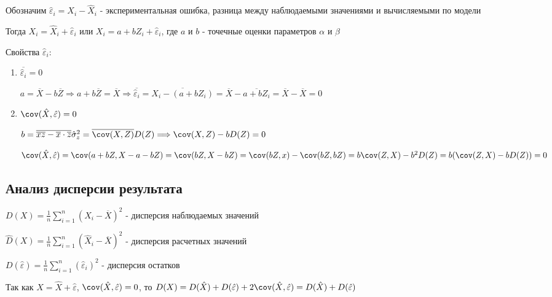 \documentclass[12pt]{article}
\begin{document}
Обозначим $\hat \varepsilon_i = X_i - \hat X_i$ - экспериментальная ошибка, разница между наблюдаемыми значениями и 
вычисляемыми по модели

Тогда $X_i = \hat X_i + \hat \varepsilon_i$ или $X_i = a + b Z_i + \hat \varepsilon_i$, где $a$ и $b$ - точечные оценки параметров $\alpha$ и $\beta$

Свойства $\hat \varepsilon_i$:

\begin{enumerate}
    \item $\overline{\hat \varepsilon_i} = 0$

    \begin{MyProof}
        $a = \overline{X} - b \overline{Z} \Longrightarrow a + b \overline{Z} = \overline{X} \Longrightarrow \overline{\hat \varepsilon_i} = \overline{X_i - (a + b Z_i)} = \overline{X} - \overline{a + b Z_i} = \overline{X} - \overline{X} = 0$
    \end{MyProof}

    \item $\cov (\hat X, \hat \varepsilon) = 0$

    \begin{MyProof}
        $b = \overline{\overline{xz} - \overline{x} \cdot \overline{z}}{\hat \sigma^2_z} = \overline{\cov (X, Z)}{D(Z)} \Longrightarrow \cov (X, Z) - b D(Z) = 0$

        $\cov (\hat X, \hat \varepsilon) = \cov (a + b Z, X - a - bZ) = \cov (bZ, X - bZ) = \cov (bZ, x) - \cov (bZ, bZ) = b \cov (Z, X) - b^2 D(Z) = b (\cov (Z, X) - b D(Z)) = 0$
    \end{MyProof}
\end{enumerate}

\subsection{Анализ дисперсии результата}

\Def $D(X) = \frac{1}{n} \sum_{i = 1}^n (X_i - \overline{X})^2$ - дисперсия наблюдаемых значений

\Defs $\hat D(X) = \frac{1}{n} \sum_{i = 1}^n (\hat X_i - \overline{X})^2$ - дисперсия расчетных значений

\Defs $D(\hat \varepsilon) = \frac{1}{n} \sum_{i = 1}^n (\hat \varepsilon_i)^2$ - дисперсия остатков

Так как $X = \hat X + \hat \varepsilon$, $\cov (\hat X, \hat \varepsilon) = 0$, то $D(X) = D(\hat X) + D(\hat \varepsilon) + 2\cov (\hat X, \hat \varepsilon) = D(\hat X) + D(\hat \varepsilon)$
\end{document}
